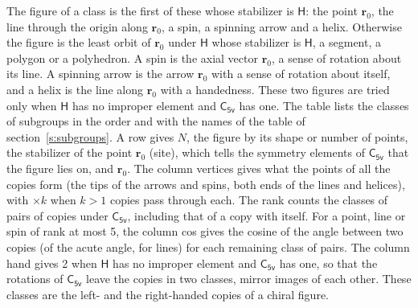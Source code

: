 \documentclass[10pt,a4paper]{article}
\numberwithin{equation}{section}
\newcommand{\grp}[1]{\mathsf{#1}}
\newcommand{\pointr}{\mathbf{r}}
\begin{document}
\leavevmode\label{n:head.figure}The figure of a class is the first of these whose stabilizer is $\grp{H}$: the point $\pointr_0$, the line through the origin along $\pointr_0$, a spin, a spinning arrow and a helix. Otherwise the figure is the least orbit of $\pointr_0$ under $\grp{H}$ whose stabilizer is $\grp{H}$, a segment, a polygon or a polyhedron. A spin is the axial vector $\pointr_0$, a sense of rotation about its line. A spinning arrow is the arrow $\pointr_0$ with a sense of rotation about itself, and a helix is the line along $\pointr_0$ with a handedness. These two figures are tried only when $\grp{H}$ has no improper element and $\grp{C_{5v}}$ has one. The table lists the classes of subgroups in the order and with the names of the table of section~\ref{s:subgroups}. \label{n:head.site}A row gives $N$, the figure by its shape or number of points, the stabilizer of the point $\pointr_0$ (site), which tells the symmetry elements of $\grp{C_{5v}}$ that the figure lies on, and $\pointr_0$. \label{n:head.vertices}The column vertices gives what the points of all the copies form (the tips of the arrows and spins, both ends of the lines and helices), with ${\times}k$ when $k > 1$ copies pass through each. \label{n:head.rank}The rank counts the classes of pairs of copies under $\grp{C_{5v}}$, including that of a copy with itself. \label{n:head.cos}For a point, line or spin of rank at most 5, the column cos gives the cosine of the angle between two copies (of the acute angle, for lines) for each remaining class of pairs. \label{n:head.hand}The column hand gives 2 when $\grp{H}$ has no improper element and $\grp{C_{5v}}$ has one, so that the rotations of $\grp{C_{5v}}$ leave the copies in two classes, mirror images of each other. These classes are the left- and the right-handed copies of a chiral figure.
\end{document}
